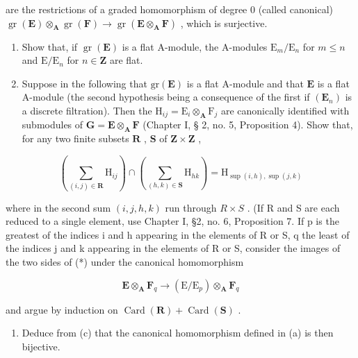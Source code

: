 are the restrictions of a graded homomorphism of degree 0 (called canonical) \(\operatorname{gr}(\mathbf{E}) \otimes_{\mathbf{A}} \operatorname{gr}(\mathbf{F}) \to \operatorname{gr}(\mathbf{E} \otimes_{\mathbf{A}} \mathbf{F})\) , which is surjective.

\begin{enumerate}
\def\labelenumi{(\alph{enumi})}
\setcounter{enumi}{1}
\item
  Show that, if \(\operatorname{gr}(\mathbf{E})\) is a flat A-module, the A-modules \(\mathrm{E}_m / \mathrm{E}_n\) for \(m \leqslant n\) and \(\mathrm{E} / \mathrm{E}_n\) for \(n \in \mathbf{Z}\) are flat.
\item
  Suppose in the following that \(\mathrm{gr}(\mathbf{E})\) is a flat A-module and that \(\mathbf{E}\) is a flat A-module (the second hypothesis being a consequence of the first if \((\mathbf{E}_n)\) is a discrete filtration). Then the \(\mathrm{H}_{ij} = \mathrm{E}_i \otimes_{\mathbf{A}} \mathrm{F}_j\) are canonically identified with submodules of \(\mathbf{G} = \mathbf{E} \otimes_{\mathbf{A}} \mathbf{F}\) (Chapter I, § 2, no. 5, Proposition 4). Show that, for any two finite subsets \(\mathbf{R}\) , \(\mathbf{S}\) of \(\mathbf{Z} \times \mathbf{Z}\) ,
\end{enumerate}

\[
\left(\sum_ {(i, j) \in \mathbf {R}} \mathrm{H} _ {i j}\right) \cap \left(\sum_ {(h, k) \in \mathbf {S}} \mathrm{H} _ {h k}\right) = \mathrm{H} _ {\sup (i, h), \sup (j, k)}\tag{*}
\]

where in the second sum \((i,j,h,k)\) run through \(R \times S\) . (If R and S are each reduced to a single element, use Chapter I, §2, no. 6, Proposition 7. If p is the greatest of the indices i and h appearing in the elements of R or S, q the least of the indices j and k appearing in the elements of R or S, consider the images of the two sides of (*) under the canonical homomorphism

\[
\mathbf {E} \otimes_ {\mathbf {A}} \mathbf {F} _ {q} \rightarrow (\mathrm{E} / \mathrm{E} _ {p}) \otimes_ {\mathbf {A}} \mathbf {F} _ {q}
\]

and argue by induction on \(\operatorname{Card}(\mathbf{R}) + \operatorname{Card}(\mathbf{S})\) .

\begin{enumerate}
\def\labelenumi{(\alph{enumi})}
\setcounter{enumi}{3}
\tightlist
\item
  Deduce from (c) that the canonical homomorphism defined in (a) is then bijective.
\end{enumerate}

